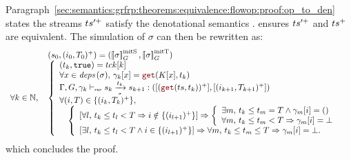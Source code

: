 \begin{skippableproof}
    Paragraph~\ref{sec:semantics:grfrp:theorems:equivalence:flowop:proof:op_to_den} states the streams
    $ts^{\prime+}$ satisfy the denotational semantics .
     ensures $ts^{\prime+}$ and $ts^+$ are equivalent.
    The simulation of $\sigma$ can then be rewritten as:
    \begin{equation*}
        \begin{array}{ll}
                                 & (s_0, (i_0, T_0)^+) = (\initstate{\sigma}, \inittimer{\sigma}) \\
            \forall k \in \N, \, &
            \left\{
            \begin{array}{l}
                (t_k, \true) = \tck[k]                                                                       \\
                \forall x \in \depSet{\sigma}, \, \gamma_k[x] = \getAt{K[x]}{t_k}                            \\
                \sigmaOpSem{\gamma_k}{s_k}{\sigma}{t_k}{s_{k+1}}{(\getAt{\ts}{t_k})^+}{(i_{k+1}, T_{k+1})^+} \\
                \forall (i, T) \in \{(i_k, T_k)^+\},                                                         \\
                \quad \left\{
                \begin{array}{l}
                    \left[\forall l, \, t_k \le t_l < T \Rightarrow i \notin \{(i_{l+1})^+\} \right]
                    \Rightarrow
                    \left\{\begin{array}{l}
                               \exists m, \, t_k \le t_m = T \wedge \gamma_m[i] = () \\
                               \forall m, \, t_k \le t_m < T \Rightarrow \gamma_m[i] = \bot
                           \end{array}\right.          \\
                    \left[\exists l, \, t_k \le t_l < T \wedge i \in \{(i_{l+1})^+\} \right]
                    \Rightarrow \forall m, \, t_k \le t_m \le T \Rightarrow \gamma_m[i] = \bot. \\
                \end{array}
                \right.
            \end{array}
            \right.
        \end{array}
    \end{equation*}
    which concludes the proof.

    \setcounter{paragraph}{0}
\end{skippableproof}

